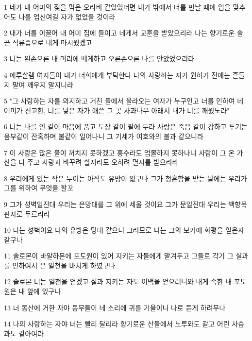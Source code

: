 \par 1 네가 내 어미의 젖을 먹은 오라비 같았었더면 내가 밖에서 너를 만날 때에 입을 맞추어도 나를 업신여길 자가 없었을 것이라
\par 2 내가 너를 이끌어 내 어미 집에 들이고 네게서 교훈을 받았으리라 나는 향기로운 술 곧 석류즙으로 네게 마시웠겠고
\par 3 너는 왼손으론 내 머리에 베게하고 오른손으론 나를 안았었으리라
\par 4 예루살렘 여자들아 내가 너희에게 부탁한다 나의 사랑하는 자가 원하기 전에는 흔들지 말며 깨우지 말지니라
\par 5 "그 사랑하는 자를 의지하고 거친 들에서 올라오는 여자가 누구인고 너를 인하여 네 어미가 신고한, 너를 낳은 자가 애쓴 그 곳 사과나무 아래서 내가 너를 깨웠노라"
\par 6 너는 나를 인 같이 마음에 품고 도장 같이 팔에 두라 사랑은 죽음 같이 강하고 투기는 음부같이 잔혹하며 불같이 일어나니 그 기세가 여호와의 불과 같으니라
\par 7 이 사랑은 많은 물이 꺼치지 못하겠고 홍수라도 엄몰하지 못하나니 사람이 그 온 가산을 다 주고 사랑과 바꾸려 할지라도 오히려 멸시를 받으리라
\par 8 우리에게 있는 작은 누이는 아직도 유방이 없구나 그가 청혼함을 받는 날에는 우리가 그를 위하여 무엇을 할꼬
\par 9 그가 성벽일진대 우리는 은망대를 그 위에 세울 것이요 그가 문일진대 우리는 백향목 판자로 두르리라
\par 10 나는 성벽이요 나의 유방은 망대 같으니 그러므로 나는 그의 보기에 화평을 얻은자 같구나
\par 11 솔로몬이 바알하몬에 포도원이 있어 지키는 자들에게 맡겨두고 그들로 각기 그 실과를 인하여서 은 일천을 바치게 하였구나
\par 12 솔로몬 너는 일천을 얻겠고 실과 지키는 자도 이백을 얻으려니와 내게 속한 내 포도원은 내 앞에 있구나
\par 13 너 동산에 거한 자야 동무들이 네 소리에 귀를 기울이니 나로 듣게 하려무나
\par 14 나의 사랑하는 자야 너는 빨리 달리라 향기로운 산들에서 노루와도 같고 어린 사슴과도 같아여라


